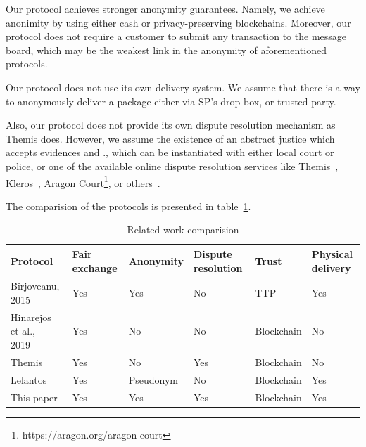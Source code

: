 \documentclass{ieeeaccess}
\begin{document}
Our protocol achieves stronger anonymity guarantees. Namely, we achieve anonimity by using either cash or privacy-preserving blockchains. Moreover, our protocol does not require a customer to submit any transaction to the message board, which may be the weakest link in the anonymity of aforementioned protocols.

Our protocol does not use its own delivery system. We assume that there is a way to anonymously deliver a package either via SP's drop box, or trusted party.

Also, our protocol does not provide its own dispute resolution mechanism as Themis does. However, we assume the existence of an abstract justice which accepts evidences and ., which can be instantiated with either local court or police, or one of the available online dispute resolution services like Themis~\cite{mengThemisDecentralizedEscrow2019}, Kleros~\cite{bergollaKlerosSociolegalCase2022}, Aragon Court\footnote{https://aragon.org/aragon-court}, or others~\cite{allenGovernanceBlockchainDispute2019}.

The comparision of the protocols is presented in table~\ref{tab:comparision}.


\begin{table}
  \newcommand{\YES}{\cellcolor{green!50}Yes}
  \newcommand{\ID}{\cellcolor{green!25}Identity}
  \newcommand{\PSEUDO}{\cellcolor{green!25}Pseudonym}
  \newcommand{\ANON}{\cellcolor{green!50}Anonymity}
  \newcommand{\NO}{\cellcolor{red!50}No}
  \newcommand{\TTP}{\cellcolor{red!50}TTP}
  \newcommand{\BC}{\cellcolor{green!50}Blockchain}
  \caption{Related work comparision}
  \label{tab:comparision}
  \setlength{\tabcolsep}{3pt}
  \begin{tabular}{|p{38pt}|p{32pt}|p{38pt}|p{35pt}|p{37pt}|p{30pt}|}
  \hline
  Protocol & Fair exchange & Anonymity & Dispute resolution & Trust & Physical delivery \\
  \hline
  Bîrjoveanu, 2015~\cite{birjoveanuAnonymityFairexchangeEcommerce2015} & \YES & \YES & \NO & \TTP & \YES \\
  \hline
  Hinarejos et al., 2019~\cite{hinarejosSolutionSecureCertified2019} & \YES & \NO & \NO & \BC & \NO \\
  \hline
  Themis~\cite{mengThemisDecentralizedEscrow2019} & \YES & \NO & \YES & \BC & \NO \\
  \hline
  Lelantos~\cite{altawyLelantosBlockchainBasedAnonymous2017} & \YES & \PSEUDO & \NO & \BC & \YES \\
  \hline
  This paper & \YES & \YES & \YES & \BC & \YES \\
  \hline

  \end{tabular}
\end{table}
 
\end{document}
